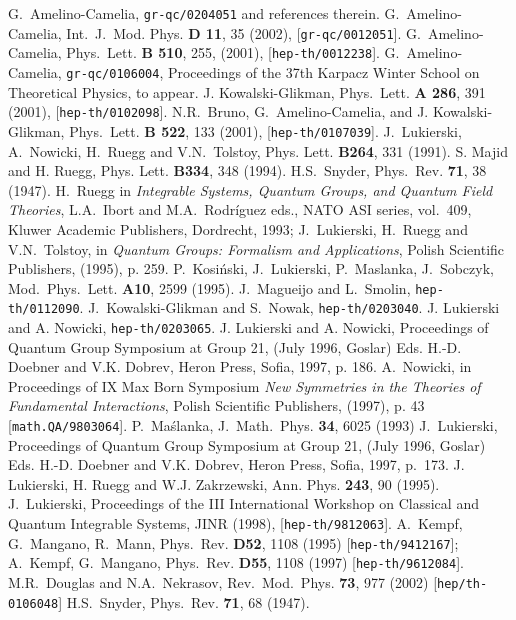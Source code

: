 \documentclass [prd,twocolumn,nofootinbib,showpacs]  {revtex4}
\begin{document}
\begin{thebibliography}{99}
 G.~Amelino-Camelia, {\tt gr-qc/0204051} and references therein.
 G.~Amelino-Camelia,  Int.~J.~Mod. Phys. {\bf D 11}, 35 (2002), [{\tt gr-qc/0012051}].
 G.~Amelino-Camelia,  Phys.~Lett. {\bf B 510}, 255, (2001), [{\tt hep-th/0012238}].
 G.~Amelino-Camelia, {\tt gr-qc/0106004}, Proceedings of the 37th
Karpacz Winter School on Theoretical Physics, to appear.
 J. Kowalski-Glikman, Phys.~Lett. {\bf A 286}, 391 (2001), [{\tt hep-th/0102098}].
 N.R.~Bruno, G.~Amelino-Camelia, and J. Kowalski-Glikman, Phys.~Lett. {\bf B 522},
133 (2001), [{\tt hep-th/0107039}].
 J.~Lukierski, A.~Nowicki, H.~Ruegg and V.N.~Tolstoy,
Phys. Lett.  {\bf B264}, 331 (1991).
 S. Majid and H. Ruegg, Phys. Lett. {\bf B334},
348 (1994).
 H.S.~Snyder, Phys.~Rev. {\bf 71}, 38 (1947).
 H.~Ruegg in {\em Integrable Systems, Quantum Groups, and Quantum Field Theories},
L.A.~Ibort and M.A.~Rodr\'iguez eds., NATO ASI series, vol.~409,
Kluwer Academic Publishers, Dordrecht, 1993; J.~Lukierski,
 H.~Ruegg and V.N.~Tolstoy, in {\em Quantum Groups: Formalism and
 Applications}, Polish Scientific Publishers, (1995), p. 259.
 P.~Kosi\'nski, J.~Lukierski, P.~Maslanka, J.~Sobczyk, Mod.~Phys.~Lett. {\bf A10}, 2599 (1995).
 J.~Magueijo and L.~Smolin, {\tt hep-th/0112090}.
 J.~Kowalski-Glikman and S.~Nowak, {\tt hep-th/0203040}.
 J. Lukierski and A. Nowicki, {\tt hep-th/0203065}.
 J. Lukierski and A. Nowicki, Proceedings of
Quantum Group Symposium at Group 21, (July 1996, Goslar) Eds.
H.-D. Doebner and V.K. Dobrev, Heron Press, Sofia, 1997, p.
186.
  A.~Nowicki, in Proceedings of IX Max Born Symposium {\em New Symmetries in the
Theories of Fundamental Interactions}, Polish Scientific
Publishers, (1997), p. 43 [{\tt math.QA/9803064}].
 P.~Ma\'slanka, J.~Math.~Phys. {\bf 34}, 6025 (1993)
 J.~Lukierski, Proceedings of
Quantum Group Symposium at Group 21, (July 1996, Goslar) Eds.
H.-D. Doebner and V.K. Dobrev, Heron Press, Sofia, 1997, p.~173.
 J. Lukierski, H. Ruegg and W.J. Zakrzewski, Ann.
Phys. {\bf 243}, 90 (1995).
 J.~Lukierski, Proceedings of
the III International Workshop on Classical and Quantum Integrable
Systems, JINR (1998), [{\tt hep-th/9812063}].
 A.~Kempf, G.~Mangano, R.~Mann, Phys.~Rev. {\bf D52}, 1108 (1995) [{\tt hep-th/9412167}];
A.~Kempf, G.~Mangano, Phys.~Rev. {\bf D55}, 1108 (1997) [{\tt hep-th/9612084}].
 M.R.~Douglas and N.A.~Nekrasov, Rev.~Mod.~Phys. {\bf 73}, 977 (2002) [{\tt hep/th-0106048}]
 H.S.~Snyder, Phys.~Rev. {\bf 71}, 68 (1947).
\end{thebibliography}
\end{document}
